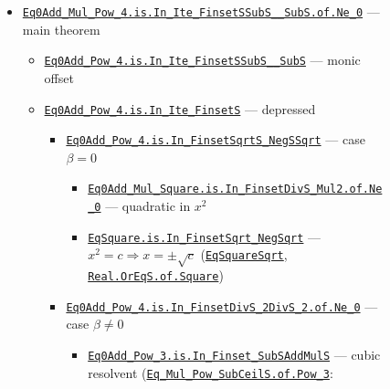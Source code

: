\documentclass[11pt,a4paper]{article}
\begin{document}
\begin{figure}[ht]
\small
\begin{itemize}[leftmargin=1.2em,itemsep=0.15em]
  \item \href{http://www.lemma.cn/lean/?module=Complex.Eq0Add_Mul_Pow_4.is.In_Ite_FinsetSSubS__SubS.of.Ne_0}{\texttt{Eq0Add\_Mul\_Pow\_4.is.In\_Ite\_FinsetSSubS\_\_SubS.of.Ne\_0}} --- main theorem
  \begin{itemize}[leftmargin=1.1em,itemsep=0.1em]
    \item \href{http://www.lemma.cn/lean/?module=Complex.Eq0Add_Pow_4.is.In_Ite_FinsetSSubS__SubS}{\texttt{Eq0Add\_Pow\_4.is.In\_Ite\_FinsetSSubS\_\_SubS}} --- monic offset
    \item \href{http://www.lemma.cn/lean/?module=Complex.Eq0Add_Pow_4.is.In_Ite_FinsetS}{\texttt{Eq0Add\_Pow\_4.is.In\_Ite\_FinsetS}} --- depressed
    \begin{itemize}[leftmargin=1.1em,itemsep=0.05em]
      \item \href{http://www.lemma.cn/lean/?module=Complex.Eq0Add_Pow_4.is.In_FinsetSqrtS_NegSSqrt}{\texttt{Eq0Add\_Pow\_4.is.In\_FinsetSqrtS\_NegSSqrt}} --- case \(\beta=0\)
      \begin{itemize}[leftmargin=1.1em,itemsep=0.05em]
        \item \href{http://www.lemma.cn/lean/?module=Complex.Eq0Add_Mul_Square.is.In_FinsetDivS_Mul2.of.Ne_0}{\texttt{Eq0Add\_Mul\_Square.is.In\_FinsetDivS\_Mul2.of.Ne\_0}} --- quadratic in \(x^2\)
        \item \href{http://www.lemma.cn/lean/?module=Complex.EqSquare.is.In_FinsetSqrt_NegSqrt}{\texttt{EqSquare.is.In\_FinsetSqrt\_NegSqrt}} --- \(x^2=c\Rightarrow x=\pm\sqrt{c}\)
        (\href{http://www.lemma.cn/lean/?module=Complex.EqSquareSqrt}{\texttt{EqSquareSqrt}},
        \href{http://www.lemma.cn/lean/?module=Real.OrEqS.of.Square}{\texttt{Real.OrEqS.of.Square}})
      \end{itemize}
      \item \href{http://www.lemma.cn/lean/?module=Complex.Eq0Add_Pow_4.is.In_FinsetDivS_2DivS_2.of.Ne_0}{\texttt{Eq0Add\_Pow\_4.is.In\_FinsetDivS\_2DivS\_2.of.Ne\_0}} --- case \(\beta\neq 0\)
      \begin{itemize}[leftmargin=1.1em,itemsep=0.05em]
        \item \href{http://www.lemma.cn/lean/?module=Complex.Eq0Add_Pow_3.is.In_Finset_SubSAddMulS}{\texttt{Eq0Add\_Pow\_3.is.In\_Finset\_SubSAddMulS}} --- cubic resolvent
        (\href{http://www.lemma.cn/lean/?module=Complex.Eq_Mul_Pow_SubCeilS.of.Pow_3}{\texttt{Eq\_Mul\_Pow\_SubCeilS.of.Pow\_3}}:

\end{itemize}
\end{itemize}
\end{itemize}
\end{itemize}
\end{figure}
\end{document}
